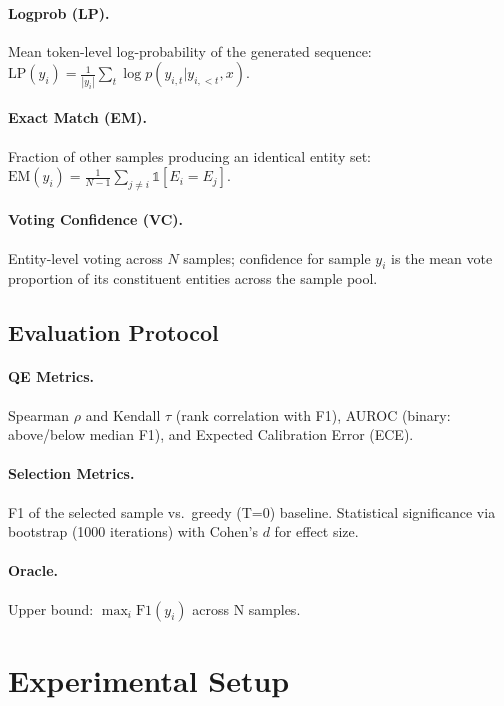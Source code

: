 \documentclass[11pt,a4paper]{article}
\begin{document}
\paragraph{Logprob (LP).} Mean token-level log-probability of the generated sequence: $\text{LP}(y_i) = \frac{1}{|y_i|} \sum_t \log p(y_{i,t} | y_{i,<t}, x)$.

\paragraph{Exact Match (EM).} Fraction of other samples producing an identical entity set: $\text{EM}(y_i) = \frac{1}{N{-}1} \sum_{j \neq i} \mathbb{1}[E_i = E_j]$.

\paragraph{Voting Confidence (VC).} Entity-level voting across $N$ samples; confidence for sample $y_i$ is the mean vote proportion of its constituent entities across the sample pool.

\subsection{Evaluation Protocol}

\paragraph{QE Metrics.} Spearman $\rho$ and Kendall $\tau$ (rank correlation with F1), AUROC (binary: above/below median F1), and Expected Calibration Error (ECE).

\paragraph{Selection Metrics.} F1 of the selected sample vs.\ greedy (T=0) baseline. Statistical significance via bootstrap (1000 iterations) with Cohen's $d$ for effect size.

\paragraph{Oracle.} Upper bound: $\max_i \text{F1}(y_i)$ across N samples.

\section{Experimental Setup}
\end{document}
